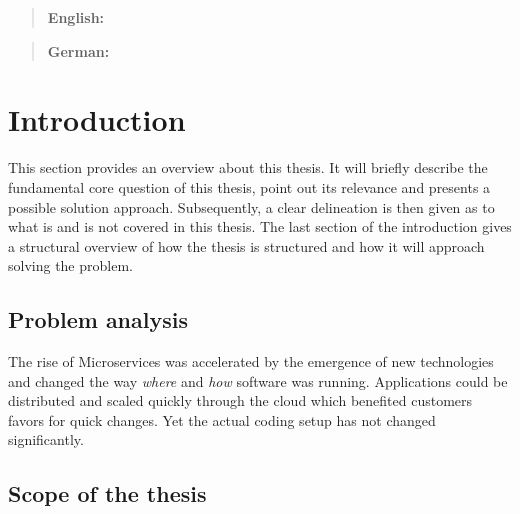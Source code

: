 \documentclass[12pt, a4paper]{article}
\begin{document}


\maketitle
\begin{abstract}
    \textbf{English:} \lipsum[20]
\end{abstract}
\begin{abstract}
    \textbf{German:} \lipsum[20]
\end{abstract}
\newpage

\tableofcontents
\newpage

\setcounter{lastroman}{\value{page}}

\section{Introduction}\label{sec::intro}
This section provides an overview about this thesis. It will briefly describe the fundamental core question of this thesis, point out its relevance and presents a possible solution approach. Subsequently, a clear delineation is then given as to what is and is not covered in this thesis. The last section of the introduction gives a structural overview of how the thesis is structured and how it will approach solving the problem.
    \subsection{Problem analysis}
    The rise of Microservices was accelerated by the emergence of new technologies and changed the way \textit{where} and \textit{how} software was running. Applications could be distributed and scaled quickly through the cloud which benefited customers favors for quick changes. Yet the actual coding setup has not changed significantly.\newline

    \subsection{Scope of the thesis}
\end{document}
